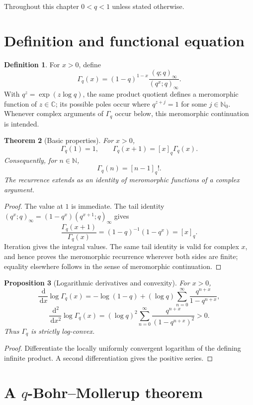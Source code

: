 \documentclass[11pt,oneside,openany]{book}
\newtheorem{theorem}{Theorem}[chapter]
\newtheorem{proposition}[theorem]{Proposition}
\theoremstyle{definition}
\newtheorem{definition}[theorem]{Definition}
\theoremstyle{remark}
\newcommand{\C}{\mathbb C}
\newcommand{\N}{\mathbb N}
\newcommand{\dd}{\,\mathrm d}
\begin{document}
Throughout this chapter $0<q<1$ unless stated otherwise.

\section{Definition and functional equation}

\begin{definition}
For $x>0$, define
\[
 \Gamma_q(x)
 =(1-q)^{1-x}\frac{(q;q)_\infty}{(q^x;q)_\infty}.
\]
With $q^z=\exp(z\log q)$, the same product quotient defines a
meromorphic function of $z\in\C$; its possible poles occur where
$q^{z+j}=1$ for some $j\in\N_0$.  Whenever complex arguments of
$\Gamma_q$ occur below, this meromorphic continuation is intended.
\end{definition}

\begin{theorem}[Basic properties]\label{thm:qgamma-basic}
For $x>0$,
\[
 \Gamma_q(1)=1,
 \qquad
 \Gamma_q(x+1)=[x]_q\Gamma_q(x).
\]
Consequently, for $n\in\N$,
\[
 \Gamma_q(n)=[n-1]_q!.
\]
The recurrence extends as an identity of meromorphic functions of a
complex argument.
\end{theorem}

\begin{proof}
The value at $1$ is immediate.  The tail identity
\(
 (q^x;q)_\infty=(1-q^x)(q^{x+1};q)_\infty
\)
gives
\[
 \frac{\Gamma_q(x+1)}{\Gamma_q(x)}
 =(1-q)^{-1}(1-q^x)=[x]_q.
\]
Iteration gives the integral values.  The same tail identity is valid for
complex $x$, and hence proves the meromorphic recurrence wherever both
sides are finite; equality elsewhere follows in the sense of
meromorphic continuation.
\end{proof}

\begin{proposition}[Logarithmic derivatives and convexity]\label{prop:qgamma-convex}
For $x>0$,
\[
 \frac{\dd}{\dd x}\log\Gamma_q(x)
 =-\log(1-q)+(\log q)\sum_{n=0}^{\infty}
 \frac{q^{n+x}}{1-q^{n+x}},
\]
\[
 \frac{\dd^2}{\dd x^2}\log\Gamma_q(x)
 = (\log q)^2\sum_{n=0}^{\infty}
 \frac{q^{n+x}}{(1-q^{n+x})^2}>0.
\]
Thus $\Gamma_q$ is strictly log-convex.
\end{proposition}

\begin{proof}
Differentiate the locally uniformly convergent logarithm of the defining infinite product.  A second differentiation gives the positive series.
\end{proof}

\section{A \texorpdfstring{$q$}{q}-Bohr--Mollerup theorem}
\end{document}
